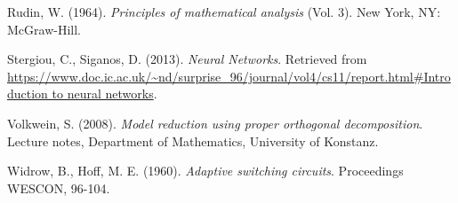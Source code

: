 \documentclass{elsarticle}
\theoremstyle{theorem}
\theoremstyle{definition}
\theoremstyle{remark}
\theoremstyle{proposition}
\numberwithin{figure}{section}
\begin{document}
\begin{thebibliography}{50}
		Rudin, W. (1964). \emph{Principles of mathematical analysis} (Vol. 3). New York, NY: McGraw-Hill.
		
		Stergiou, C., Siganos, D. (2013). \emph{Neural Networks}. Retrieved from \url{https://www.doc.ic.ac.uk/~nd/surprise_96/journal/vol4/cs11/report.html#Introduction to neural networks}.
		
		Volkwein, S. (2008). \emph{Model reduction using proper orthogonal decomposition}. Lecture notes, Department of Mathematics, University of Konstanz.
		
		Widrow, B., Hoff, M. E. (1960). \emph{Adaptive switching circuits}. Proceedings WESCON, 96-104.
		
	\end{thebibliography}
	
\end{document}
